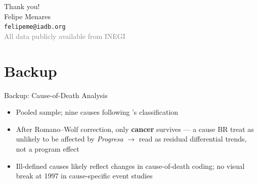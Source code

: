 \documentclass[aspectratio=169,usenames,dvipsnames]{beamer}
\newcommand{\backupbegin}{
   \newcounter{finalframe}
   \setcounter{finalframe}{\value{framenumber}}
}
\begin{document}
\begin{frame}
\begin{center}
\Huge{\color{Blue}Thank you!} \\[12pt]
\small{
  Felipe Menares \\
  \texttt{felipeme@iadb.org} \\[8pt]
  \textcolor{gray}{All data publicly available from INEGI}
}
\end{center}
\end{frame}

\appendix
\backupbegin
\section*{Backup}

\begin{frame}{Backup: Cause-of-Death Analysis}\label{cod}
\vspace{2pt}
\begin{center}
\scriptsize
{}
\end{center}
\vspace{4pt}
\small
\begin{itemize}
  \item[$\circ$] Pooled sample; nine causes following \cite{BarhamRowberry2013JDE}'s classification
  \item[$\circ$] After Romano--Wolf correction, only \textbf{cancer} survives --- a cause BR treat as unlikely to be affected by \textit{Progresa} $\to$ read as residual differential trends, not a program effect
  \item[$\circ$] Ill-defined causes likely reflect changes in cause-of-death coding; no visual break at 1997 in cause-specific event studies
\end{itemize}
\end{frame}
\end{document}
